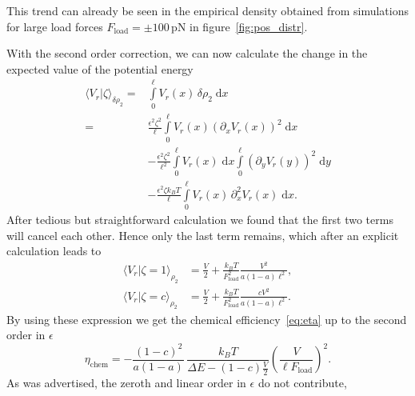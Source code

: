 \documentclass[aps,pre,twocolumn,showpacs,showkeys,superscriptaddress,floatfix]{revtex4-1}
\newcommand{\rmd}{{\mathrm d}}
\begin{document}
This trend can already be seen in the empirical density obtained from simulations for large load forces $F_\text{load} = \pm 100 \, \mathrm{pN}$ in figure~\ref{fig:pos_distr}. 


With the second order correction, we can now calculate the change in the expected value of the potential energy
\begin{align*}
\langle V_r | \zeta \rangle_{\delta\rho_2} 
=& \int\limits_0^\ell V_r(x) \, \delta\rho_2 \; \rmd x \\
=& \frac{\epsilon^2 \zeta^2}{\ell} \int\limits_0^\ell V_r(x) \left(\partial_x V_r(x) \right)^2 \; \rmd x  \\
&- \frac{\epsilon^2 \zeta^2}{\ell^2} \int\limits_0^\ell V_r(x) \; \rmd x \int\limits_0^\ell \left( \partial_y V_r(y) \right)^2 \; \rmd y \\
&- \frac{\epsilon^2 \zeta k_B T}{\ell} \int\limits_0^\ell V_r(x) \, \partial_x^2 V_r(x) \; \rmd x .
\end{align*}
After tedious but straightforward calculation we found that the first two terms will cancel each other. 
Hence only the last term remains, which after an explicit calculation leads to  
\begin{align*}
\langle V_r | \zeta = 1 \rangle_{\rho_2} &= \frac{V}{2} + \frac{k_B T}{F_\text{load}^2} \frac{V^2}{a \left(1-a\right) \ell^2 }, \\
\langle V_r | \zeta = c \rangle_{\rho_2} &= \frac{V}{2} + \frac{k_B T}{F_\text{load}^2} \frac{c V^2}{a \left(1-a\right) \ell^2 } .
\end{align*}
By using these expression we get the chemical efficiency~\eqref{eq:eta} up to the second order in $\epsilon$  
\begin{equation}
\eta_\text{chem} = - \frac{ \left(1-c\right)^2 }{ a (1-a) } \, \frac{k_B T} { \Delta E - (1-c) \frac{V}{2} } \left( \frac{V}{\ell F_\text{load}} \right)^2 .
\end{equation}
As was advertised, the zeroth and linear order in $\epsilon$ do not contribute, 
\end{document}
